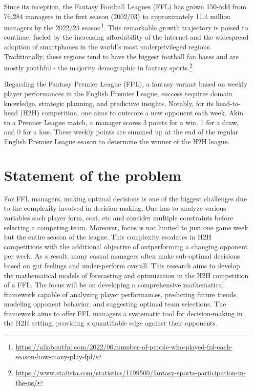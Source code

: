 \documentclass[12pt,oneside,a4paper]{book}
\theoremstyle{definition}
\theoremstyle{remark}
\begin{document}
			Since its inception, the Fantasy Football Leagues (FFL) has grown 150-fold from 76,284 managers in the first season (2002/03) to approximately 11.4 million managers by the 2022/23 season\footnote{\url{https://allaboutfpl.com/2022/06/number-of-people-who-played-fpl-each-season-how-many-play-fpl/}}. This remarkable growth trajectory is poised to continue, fueled by the increasing affordability of the internet and the widespread adoption of smartphones in the world’s most underprivileged regions. Traditionally, these regions tend to have the biggest football fan bases and are mostly youthful - the majority demographic in fantasy sports.\footnote{\url{https://www.statista.com/statistics/1199500/fantasy-sports-participation-in-the-us/}}

			Regarding the Fantasy Premier League (FPL), a fantasy variant based on weekly player performances in the English Premier League, success requires domain knowledge, strategic planning, and predictive insights. Notably, for its head-to-head (H2H) competition, one aims to outscore a new opponent each week. Akin to a Premier League match, a manager scores 3 points for a win, 1 for a draw, and 0 for a loss. These weekly points are summed up at the end of the regular English Premier League season to determine the winner of the H2H league.

		\section{Statement of the problem}
			For FFL managers, making optimal decisions is one of the biggest challenges due to the complexity involved in decision-making. One has to analyze various variables such player form, cost, etc and consider multiple constraints before selecting a competing team. Moreover, focus is not limited to just one game week but the entire season of the league. This complexity escalates in H2H competitions with the additional objective of outperforming a changing opponent per week. As a result, many casual managers often make sub-optimal decisions based on gut feelings and under-perform overall. This research aims to develop the mathematical models of forecasting and optimization in the H2H competition of a FFL. The focus will be on developing a comprehensive mathematical framework capable of analyzing player performances, predicting future trends, modeling opponent behavior, and suggesting optimal team selections. The framework aims to offer FFL managers a systematic tool for decision-making in the H2H setting, providing a quantifiable edge against their opponents.
\end{document}
